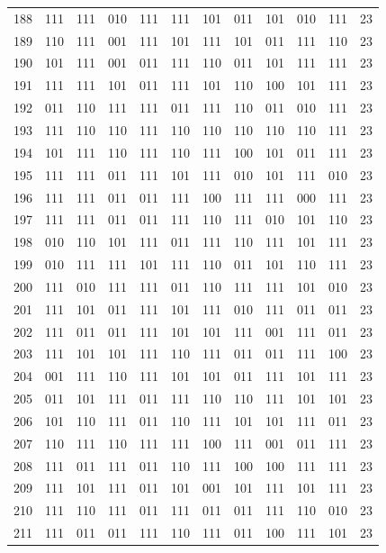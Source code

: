 \begin{longtable}{r*{10}{c}r}
188 & 111 & 111 & 010 & 111 & 111 & 101 & 011 & 101 & 010 & 111 & 23\\
189 & 110 & 111 & 001 & 111 & 101 & 111 & 101 & 011 & 111 & 110 & 23\\
190 & 101 & 111 & 001 & 011 & 111 & 110 & 011 & 101 & 111 & 111 & 23\\
191 & 111 & 111 & 101 & 011 & 111 & 101 & 110 & 100 & 101 & 111 & 23\\
192 & 011 & 110 & 111 & 111 & 011 & 111 & 110 & 011 & 010 & 111 & 23\\
193 & 111 & 110 & 110 & 111 & 110 & 110 & 110 & 110 & 110 & 111 & 23\\
194 & 101 & 111 & 110 & 111 & 110 & 111 & 100 & 101 & 011 & 111 & 23\\
195 & 111 & 111 & 011 & 111 & 101 & 111 & 010 & 101 & 111 & 010 & 23\\
196 & 111 & 111 & 011 & 011 & 111 & 100 & 111 & 111 & 000 & 111 & 23\\
197 & 111 & 111 & 011 & 011 & 111 & 110 & 111 & 010 & 101 & 110 & 23\\
198 & 010 & 110 & 101 & 111 & 011 & 111 & 110 & 111 & 101 & 111 & 23\\
199 & 010 & 111 & 111 & 101 & 111 & 110 & 011 & 101 & 110 & 111 & 23\\
200 & 111 & 010 & 111 & 111 & 011 & 110 & 111 & 111 & 101 & 010 & 23\\
201 & 111 & 101 & 011 & 111 & 101 & 111 & 010 & 111 & 011 & 011 & 23\\
202 & 111 & 011 & 011 & 111 & 101 & 101 & 111 & 001 & 111 & 011 & 23\\
203 & 111 & 101 & 101 & 111 & 110 & 111 & 011 & 011 & 111 & 100 & 23\\
204 & 001 & 111 & 110 & 111 & 101 & 101 & 011 & 111 & 101 & 111 & 23\\
205 & 011 & 101 & 111 & 011 & 111 & 110 & 110 & 111 & 101 & 101 & 23\\
206 & 101 & 110 & 111 & 011 & 110 & 111 & 101 & 101 & 111 & 011 & 23\\
207 & 110 & 111 & 110 & 111 & 111 & 100 & 111 & 001 & 011 & 111 & 23\\
208 & 111 & 011 & 111 & 011 & 110 & 111 & 100 & 100 & 111 & 111 & 23\\
209 & 111 & 101 & 111 & 011 & 101 & 001 & 101 & 111 & 101 & 111 & 23\\
210 & 111 & 110 & 111 & 011 & 111 & 011 & 011 & 111 & 110 & 010 & 23\\
211 & 111 & 011 & 011 & 111 & 110 & 111 & 011 & 100 & 111 & 101 & 23\\

\end{longtable}
